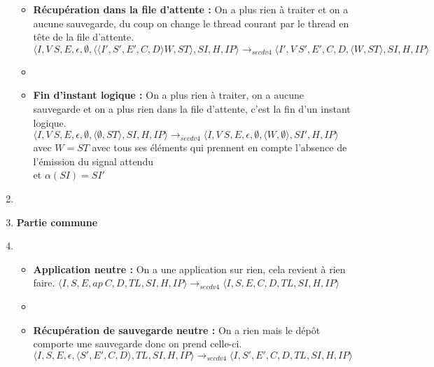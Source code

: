 \documentclass[10pt,a4paper]{report}
\begin{document}
\begin{enumerate}
\begin{itemize}
			\item[] \textbf{Récupération dans la file d'attente :} On a plus rien à traiter et on a aucune sauvegarde, du coup on change le thread courant par le thread en tête de la file d'attente.
			\smallbreak
			$\langle I,V~S,E,\epsilon,\emptyset,\langle\langle I',S',E',C,D\rangle W,ST\rangle,SI,H,IP\rangle 
			\longrightarrow_{secdv4} \langle I',V~S',E',C,D,\langle W,ST\rangle,SI,H,IP\rangle$
			\item[]
			
			\item[] \textbf{Fin d'instant logique :} On a plus rien à traiter, on a aucune sauvegarde et on a plus rien dans la file d'attente, c'est la fin d'un instant logique.
			\smallbreak
			$\langle I,V~S,E,\epsilon,\emptyset,\langle\emptyset,ST\rangle,SI,H,IP\rangle 
			\longrightarrow_{secdv4} \langle I,V~S,E,\epsilon,\emptyset,\langle W,\emptyset\rangle,SI',H,IP\rangle$\\
			avec $W = ST$ avec tous ses éléments qui prennent en compte l'absence de l'émission du signal attendu
			\\et  $\alpha(SI) = SI'$ 
		\end{itemize}
		\item[]
		\item[] \textbf{Partie commune} 
		\item[]
		\begin{itemize}
			\item[] \textbf{Application neutre :} On a une application sur rien, cela revient à rien faire.
			\smallbreak 
			$\langle I,S,E,ap~C,D,TL,SI,H,IP\rangle
			\longrightarrow_{secdv4} \langle I,S,E,C,D,TL,SI,H,IP\rangle$
			\item[]
			
			\item[] \textbf{Récupération de sauvegarde neutre :}  On a rien mais le dépôt comporte une sauvegarde donc on prend celle-ci.
			\smallbreak  
			$\langle I,S,E,\epsilon,\langle S',E',C,D\rangle,TL,SI,H,IP\rangle
			\longrightarrow_{secdv4} \langle I,S',E',C,D,TL,SI,H,IP\rangle$
		\end{itemize}
	\end{enumerate}
	\bigbreak
	\bigbreak
	
	
	
\end{document}
